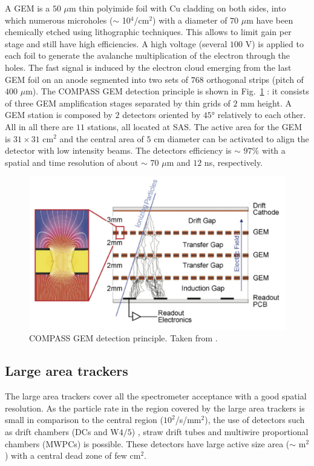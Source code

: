 A GEM is a $50$ $\mu$m thin polyimide foil with Cu cladding on both sides, into which numerous microholes ($\sim$ 10$^4$/cm$^2$) with a diameter of $70$ $\mu$m have been chemically etched using lithographic techniques. This allows to limit gain per stage and still have high efficiencies. A high voltage (several $100$ V) is applied to each foil to generate the avalanche multiplication of the electron through the holes. The fast signal is induced by the electron cloud emerging from the last GEM foil on an anode segmented into two sets of $768$ orthogonal strips (pitch of $400$ $\mu$m). The COMPASS GEM detection principle is shown in Fig.~\ref{pic:GEM} : it consists of three GEM amplification stages separated by thin grids of $2$ mm height. A GEM station is composed by $2$ detectors oriented by $45$° relatively to each other. All in all there are $11$ stations, all located at SAS. The active area for the GEM is $31 \times 31$ cm$^2$ and the central area of $5$ cm diameter can be activated to align the detector with low intensity beams. The detectors efficiency is $\sim$ $97$\% with a spatial and time resolution of about $\sim$ $70$ $\mu$m and $12$ ns, respectively.

\begin{figure}[!h]
  \centering
	\includegraphics[scale=0.5]{./gfx/GEM.png}
	\caption{COMPASS GEM detection principle. Taken from \cite{NIM}.}
	\label{pic:GEM}
\end{figure}

\subsection{Large area trackers}

The large area trackers cover all the spectrometer acceptance with a good spatial resolution. As the particle rate in the region covered by the large area trackers is small in comparison to the central region ($10^2$/s/mm$^2$), the use of detectors such as drift chambers (DCs and W$4/5$) \cite{DaCosta}, straw drift tubes \cite{Zvyagin} and multiwire proportional chambers (MWPCs) is possible. These detectors have large active size area ($\sim$ m$^2$) with a central dead zone of few cm$^2$.

